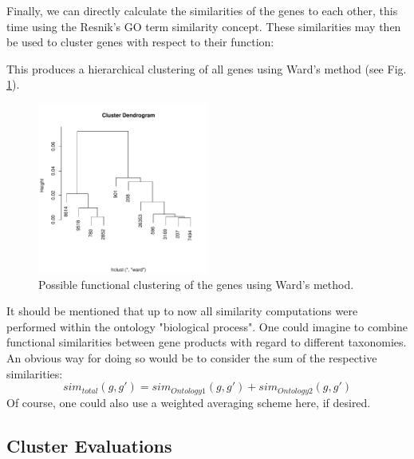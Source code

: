 \documentclass[12pt,a4paper]{article}
\begin{document}
Finally, we can directly calculate the similarities of the genes to each other, this time using the Resnik's GO term similarity concept. These similarities may then be used to cluster genes with respect to their function:
\begin{Schunk}
\end{Schunk}

This produces a hierarchical clustering of all genes using Ward's method (see Fig. \ref{Fig:GOCluster}).

\begin{figure}
\begin{center}
\includegraphics[width=0.5\textwidth]{GOClusterExample.pdf}
\caption{\label{Fig:GOCluster}Possible functional clustering of the genes using Ward's method.}
\end{center}
\end{figure}

It should be mentioned that up to now all similarity computations were performed within the ontology "biological process". One could imagine to combine functional similarities between gene products with regard to different taxonomies. An obvious way for doing so would be to consider the sum of the respective similarities:
\begin{equation}
sim_{total}(g,g') = sim_{Ontology1}(g,g') + sim_{Ontology2}(g,g')
\end{equation}
Of course, one could also use a weighted averaging scheme here, if desired.


\subsection{Cluster Evaluations}
\end{document}
